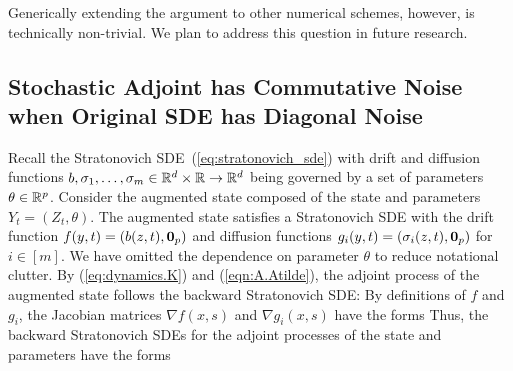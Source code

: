 \documentclass[twoside]{article}
\begin{document}
Generically extending the argument to other numerical schemes, however, is technically non-trivial.
We plan to address this question in future research.


 \subsection{Stochastic Adjoint has Commutative Noise when Original SDE has Diagonal Noise} \label{app:commutativity}
\newcommand{\aug}{ {\text{aug}} }
Recall the Stratonovich SDE~(\ref{eq:stratonovich_sde}) with drift and diffusion functions $b, \sigma_1, \dots, \sigma_m \in \mathbb{R}^d \times \mathbb{R} \to \mathbb{R}^d$ being governed by a set of parameters $\theta \in \mathbb{R}^p$.
Consider the augmented state composed of the state and parameters $Y_t = (Z_t, \theta)$. 
The augmented state satisfies a Stratonovich SDE with the drift function $f(y, t) = ( b(z, t), {\bm{0}}_p)$ and diffusion functions $g_i(y, t) = (\sigma_i(z, t), {\bm{0}}_p)$ for $i \in [m]$. 
We have omitted the dependence on parameter $\theta$ to reduce notational clutter. 
By (\ref{eq:dynamics.K}) and (\ref{eqn:A.Atilde}), the adjoint process of the augmented state follows the backward Stratonovich SDE:
By definitions of $f$ and $g_i$, the Jacobian matrices $\nabla f(x, s)$ and $\nabla g_i(x, s)$ have the forms
\vspace{-1mm}
Thus, the backward Stratonovich SDEs for the adjoint processes of the state and parameters have the forms
\end{document}
